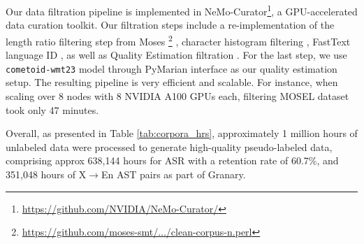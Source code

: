 Our data filtration pipeline is implemented in 
NeMo-Curator\footnote{\url{https://github.com/NVIDIA/NeMo-Curator/}},
a GPU-accelerated data curation toolkit.
Our filtration steps include a re-implementation of the length ratio filtering step from Moses
\footnote{\href{https://github.com/moses-smt/mosesdecoder/blob/master/scripts/training/clean-corpus-n.perl}{\url{https://github.com/moses-smt/.../clean-corpus-n.perl}}}
, character histogram filtering \cite{DBLP:journals/jmlr/FanBSMEGBCWCGBL21}, FastText language ID \cite{joulin2016bag}, as well as Quality Estimation filtration \cite{peter-etal-2023-theres}.
For the last step, we use \texttt{cometoid-wmt23} model \cite{gowda-etal-2023-cometoid} through PyMarian interface \cite{gowda-etal-2024-pymarian} as our quality estimation setup.
The resulting pipeline is very efficient and scalable.
For instance, when scaling over 8 nodes with 8 NVIDIA A100 GPUs each, filtering MOSEL dataset took only 47 minutes.


Overall, as presented in Table \ref{tab:corpora_hrs}, approximately 1 million hours of unlabeled data were processed to generate high-quality pseudo-labeled data, comprising approx 638,144 hours for ASR with a retention rate of 60.7\%, and 351,048 hours of X$\rightarrow$En AST pairs as part of Granary. 
